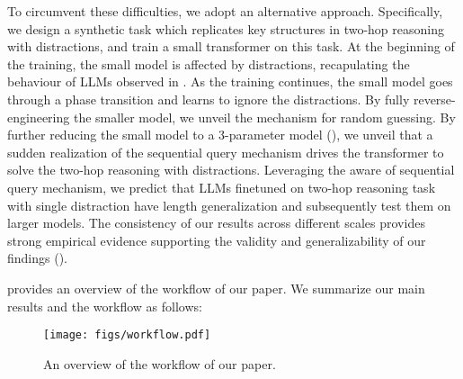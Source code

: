 To circumvent these difficulties, we adopt an alternative approach.
Specifically, we design a synthetic task which replicates key structures in two-hop reasoning with distractions, and train a small transformer on this task. At the beginning of the training, the small model is affected by distractions, recapulating the behaviour of LLMs observed in . As the training continues, the small model goes through a phase transition and learns to ignore the distractions. 
By fully reverse-engineering the smaller model, we unveil the mechanism for random guessing. By further reducing the small model to a 3-parameter model (), we unveil that a sudden realization of the sequential query mechanism drives the transformer to solve the two-hop reasoning with distractions. 
Leveraging the aware of sequential query mechanism, we predict that LLMs finetuned on two-hop reasoning task with single distraction have length generalization and subsequently test them on larger models. 
The consistency of our results across different scales provides strong empirical evidence supporting the validity and generalizability of our findings ().

 provides an overview of the workflow of our paper. We summarize our main results and the workflow as follows:

\begin{figure}
    \centering
    \texttt{[image: figs/workflow.pdf]}
    \caption{An overview of the workflow of our paper.}
    \label{fig:enter-label}
\end{figure}

